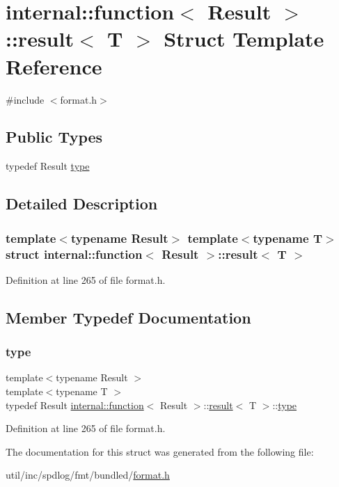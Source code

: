 \hypertarget{structinternal_1_1function_1_1result}{}\section{internal\+:\+:function$<$ Result $>$\+:\+:result$<$ T $>$ Struct Template Reference}
\label{structinternal_1_1function_1_1result}


{\ttfamily \#include $<$format.\+h$>$}

\subsection*{Public Types}
\begin{DoxyCompactItemize}
\item 
typedef Result \hyperlink{structinternal_1_1function_1_1result_a0cfececc2f74ee4d620c6b0cdeb1b1f2}{type}
\end{DoxyCompactItemize}


\subsection{Detailed Description}
\subsubsection*{template$<$typename Result$>$\newline
template$<$typename T$>$\newline
struct internal\+::function$<$ Result $>$\+::result$<$ T $>$}



Definition at line 265 of file format.\+h.



\subsection{Member Typedef Documentation}
\mbox{\label{structinternal_1_1function_1_1result_a0cfececc2f74ee4d620c6b0cdeb1b1f2}} 
\subsubsection{\texorpdfstring{type}{type}}
{\footnotesize\ttfamily template$<$typename Result $>$ \\
template$<$typename T $>$ \\
typedef Result \hyperlink{structinternal_1_1function}{internal\+::function}$<$ Result $>$\+::\hyperlink{structinternal_1_1function_1_1result}{result}$<$ T $>$\+::\hyperlink{structinternal_1_1function_1_1result_a0cfececc2f74ee4d620c6b0cdeb1b1f2}{type}}



Definition at line 265 of file format.\+h.



The documentation for this struct was generated from the following file\+:\begin{DoxyCompactItemize}
\item 
util/inc/spdlog/fmt/bundled/\hyperlink{format_8h}{format.\+h}\end{DoxyCompactItemize}
